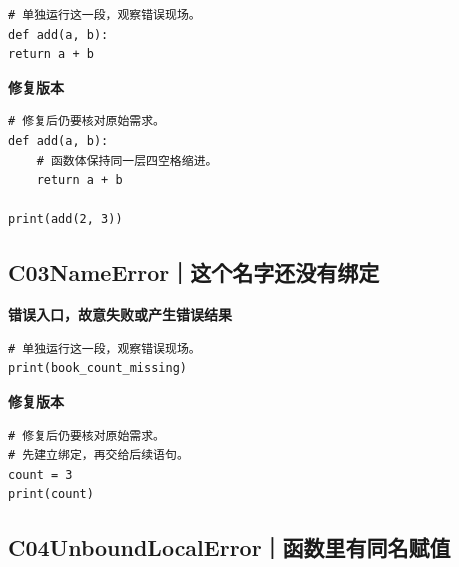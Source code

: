\begin{lstlisting}[style=errorcode,title={错误复现（故意失败或错误结果）：\code{case_02_bad.py.txt}}]
# 单独运行这一段，观察错误现场。
def add(a, b):
return a + b
\end{lstlisting}

\textbf{修复版本}

\begin{lstlisting}[title={\code{case_02.py}}]
# 修复后仍要核对原始需求。
def add(a, b):
    # 函数体保持同一层四空格缩进。
    return a + b

print(add(2, 3))
\end{lstlisting}


\subsection*{C03\enspace NameError｜这个名字还没有绑定}





\textbf{错误入口，故意失败或产生错误结果}

\begin{lstlisting}[style=errorcode,title={错误复现（故意失败或错误结果）：\code{case_03_bad.py.txt}}]
# 单独运行这一段，观察错误现场。
print(book_count_missing)
\end{lstlisting}

\textbf{修复版本}

\begin{lstlisting}[title={\code{case_03.py}}]
# 修复后仍要核对原始需求。
# 先建立绑定，再交给后续语句。
count = 3
print(count)
\end{lstlisting}


\subsection*{C04\enspace UnboundLocalError｜函数里有同名赋值}

